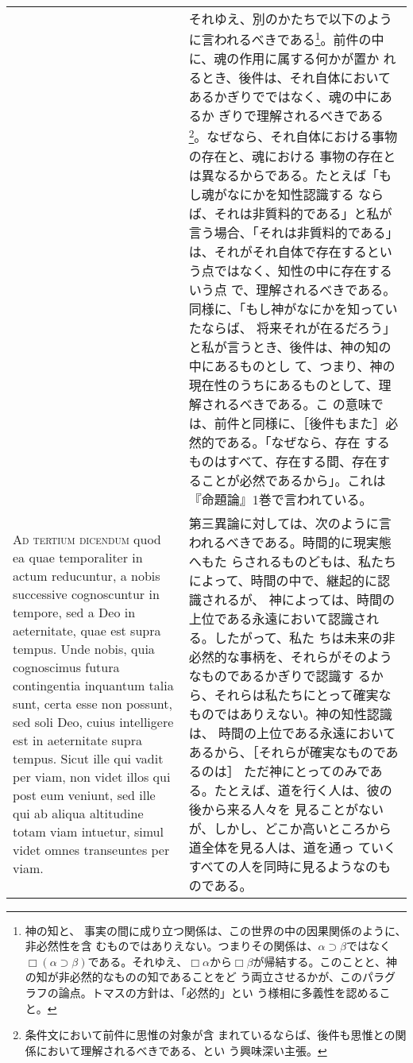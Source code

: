 \documentclass[10pt]{jsarticle} %
\begin{document}
\begin{longtable}{p{21em}p{21em}}
&

それゆえ、別のかたちで以下のように言われるべきである\footnote{神の知と、
事実の間に成り立つ関係は、この世界の中の因果関係のように、非必然性を含
むものではありえない。つまりその関係は、$\alpha \supset \beta$ではなく
$\Box(\alpha \supset \beta)$である。それゆえ、$\Box \alpha$から$\Box
\beta$が帰結する。このことと、神の知が非必然的なものの知であることをど
う両立させるかが、このパラグラフの論点。トマスの方針は、「必然的」とい
う様相に多義性を認めること。}。前件の中に、魂の作用に属する何かが置か
れるとき、後件は、それ自体においてあるかぎりでではなく、魂の中にあるか
ぎりで理解されるべきである\footnote{条件文において前件に思惟の対象が含
まれているならば、後件も思惟との関係において理解されるべきである、とい
う興味深い主張。}。なぜなら、それ自体における事物の存在と、魂における
事物の存在とは異なるからである。たとえば「もし魂がなにかを知性認識する
ならば、それは非質料的である」と私が言う場合、「それは非質料的である」
は、それがそれ自体で存在するという点ではなく、知性の中に存在するいう点
で、理解されるべきである。同様に、「もし神がなにかを知っていたならば、
将来それが在るだろう」と私が言うとき、後件は、神の知の中にあるものとし
て、つまり、神の現在性のうちにあるものとして、理解されるべきである。こ
の意味では、前件と同様に、［後件もまた］必然的である。「なぜなら、存在
するものはすべて、存在する間、存在することが必然であるから」。これは
『命題論』1巻で言われている。


\\


{\scshape Ad tertium dicendum} quod ea quae temporaliter in actum
reducuntur, a nobis successive cognoscuntur in tempore, sed a Deo in
aeternitate, quae est supra tempus. Unde nobis, quia cognoscimus
futura contingentia inquantum talia sunt, certa esse non possunt, sed
soli Deo, cuius intelligere est in aeternitate supra tempus. Sicut
ille qui vadit per viam, non videt illos qui post eum veniunt, sed
ille qui ab aliqua altitudine totam viam intuetur, simul videt omnes
transeuntes per viam.


&

第三異論に対しては、次のように言われるべきである。時間的に現実態へもた
らされるものどもは、私たちによって、時間の中で、継起的に認識されるが、
神によっては、時間の上位である永遠において認識される。したがって、私た
ちは未来の非必然的な事柄を、それらがそのようなものであるかぎりで認識す
るから、それらは私たちにとって確実なものではありえない。神の知性認識は、
時間の上位である永遠においてあるから、［それらが確実なものであるのは］
ただ神にとってのみである。たとえば、道を行く人は、彼の後から来る人々を
見ることがないが、しかし、どこか高いところから道全体を見る人は、道を通っ
ていくすべての人を同時に見るようなのものである。



\end{longtable}
\end{document}
